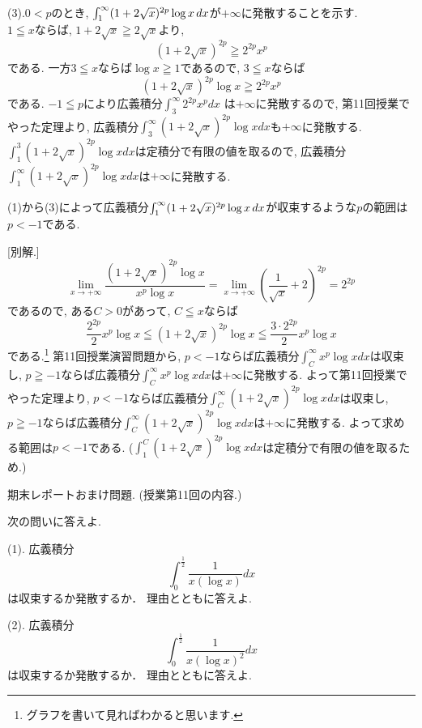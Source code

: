 \documentclass[dvipdfmx,a4paper,11pt]{article}
\theoremstyle{definition}
\begin{document}
(3).$0 < p$のとき, $\int_{1}^{\infty} (1+2\sqrt{x})^{2p} \log x \text{\,}dx$が$+ \infty$に発散することを示す. \\
$1 \leqq x$ならば, $1 + 2 \sqrt{x} \geqq 2 \sqrt{x} $より, 
$$
(1 + 2 \sqrt{x})^{2p} \geqq 2^{2p} x^{p}
$$
である. 一方$3 \leqq x$ならば$\log x \geqq 1$であるので, 
$3 \leqq x$ならば
$$
(1 + 2 \sqrt{x})^{2p} \log x \geqq 2^{2p} x^{p}
$$
である. $-1 \leqq p$により広義積分$\int_{3}^{\infty} 2^{2p} x^{p} dx$ は$+ \infty$に発散するので, 
第11回授業でやった定理より, 広義積分$\int_{3}^{\infty} (1 + 2 \sqrt{x})^{2p} \log x dx$も$+ \infty$に発散する.
$\int_{1}^{3} (1 + 2 \sqrt{x})^{2p} \log x dx$は定積分で有限の値を取るので, 広義積分
$\int_{1}^{\infty} (1 + 2 \sqrt{x})^{2p} \log x dx$は$+ \infty$に発散する.

(1)から(3)によって広義積分$\int_{1}^{\infty} (1+2\sqrt{x})^{2p} \log x \text{\,}dx $が収束するような$p$の範囲は$p <-1$である.

[別解.]
$$
\lim_{x \rightarrow + \infty} \frac{(1 + 2 \sqrt{x})^{2p} \log x}{ x^{p} \log x }
=
\lim_{x \rightarrow + \infty} \left( \frac{1}{\sqrt{x}} + 2 \right)^{2p}
= 2^{2p}
$$
であるので, ある$C>0$があって, $C \leqq x$ならば
$$
\frac{2^{2p}}{2}  x^{p} \log x \leqq (1 + 2 \sqrt{x})^{2p} \log x \leqq  \frac{3\cdot2^{2p}}{2}  x^{p} \log x
$$
である.\footnote{グラフを書いて見ればわかると思います.}
第11回授業演習問題から, $p < -1$ならば広義積分$\int_{C}^{\infty} x^{p} \log x dx$は収束し, $p \geqq -1$ならば広義積分$\int_{C}^{\infty} x^{p} \log x dx$は$+\infty$に発散する.
よって第11回授業でやった定理より, $p < -1$ならば広義積分$\int_{C}^{\infty} (1 + 2 \sqrt{x})^{2p} \log xdx$は収束し, $p \geqq -1$ならば広義積分$\int_{C}^{\infty} (1 + 2 \sqrt{x})^{2p} \log xdx$は$+\infty$に発散する.
よって求める範囲は$p <-1$である. ($\int^{C}_{1}(1 + 2 \sqrt{x})^{2p} \log x dx$は定積分で有限の値を取るため.)


\vspace{33pt} 

{\Large 期末レポートおまけ問題.} (授業第11回の内容.)
\vspace{11pt}

次の問いに答えよ.

\vspace{11pt}

(1). 広義積分
$$ \int_{0}^{\frac{1}{2}} \frac{1}{x (\log x)} dx$$
は収束するか発散するか． 理由とともに答えよ.
 
(2). 広義積分
$$ \int_{0}^{\frac{1}{2}} \frac{1}{x (\log x)^2} dx$$
は収束するか発散するか． 理由とともに答えよ.
 
\end{document}
